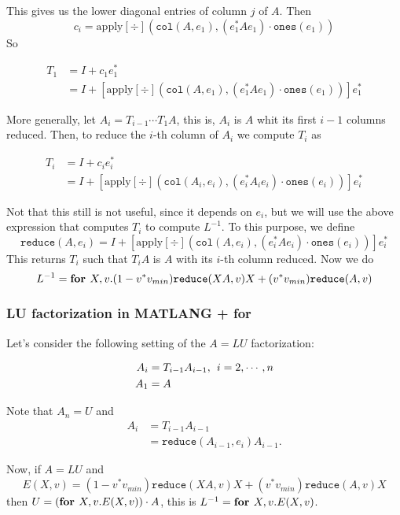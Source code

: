 This gives us the lower diagonal entries of column $j$ of $A$. Then $$c_i=\text{apply}[\div]\left(\texttt{col}(A, e_1), (e_1^*Ae_1)\cdot\texttt{ones}(e_1) \right)$$ So

\begin{align*}
	T_1&=I+c_1e_1^* \\
	&=I + \left[ \text{apply}[\div]\left(\texttt{col}(A, e_1), (e_1^*Ae_1)\cdot\texttt{ones}(e_1) \right)\right]e_1^* 
\end{align*}

More generally, let $A_i=T_{i-1} \cdots T_1A$, this is, $A_i$ is $A$ whit its first $i-1$ columns reduced. Then, to reduce the $i$-th column of $A_i$ we compute $T_{i}$ as 

\begin{align*}
	T_{i}&=I+c_{i}e_{i}^* \\
	&=I + \left[ \text{apply}[\div]\left(\texttt{col}(A_i, e_{i}), (e_{i}^*A_ie_{i})\cdot\texttt{ones}(e_{i}) \right)\right]e_{i}^* 
\end{align*}

Not that this still is not useful, since it depends on $e_i$, but we will use the above expression that computes $T_i$ to compute $L^{-1}$. To this purpose, we define $$\texttt{reduce}(A,e_i)= I + \left[ \text{apply}[\div]\left(\texttt{col}(A, e_i), (e_i^*Ae_i)\cdot\texttt{ones}(e_i) \right)\right]e_i^* $$ This returns $T_i$ such that $T_iA$ is $A$ with its $i$-th column reduced. Now we do $$L^{-1}=\textbf{for } X,v. (1-v^*v_{min})\texttt{reduce}(XA,v)X + (v^*v_{min})\texttt{reduce}(A,v)$$

\subsubsection{LU factorization in MATLANG + for}
Let's consider the following setting of the $A=LU$ factorization:

\begin{align*}
A_i&=T_{i-1}A_{i-1},\hspace{1ex}i=2, \cdots, n \\
A_1&=A \\
\end{align*}

Note that $A_n=U$ and 
\begin{align*}
A_i&=T_{i-1}A_{i-1} \\
&=\texttt{reduce}(A_{i-1},e_i)A_{i-1}.
\end{align*}

Now, if $A=LU$ and $$E(X, v)=(1-v^*v_{min})\texttt{reduce}(XA,v)X + (v^*v_{min})\texttt{reduce}(A,v)X$$
then $U=(\textbf{for } X, v.E(X,v))\cdot A$, this is $L^{-1}=\textbf{for } X, v.E(X,v)$.

